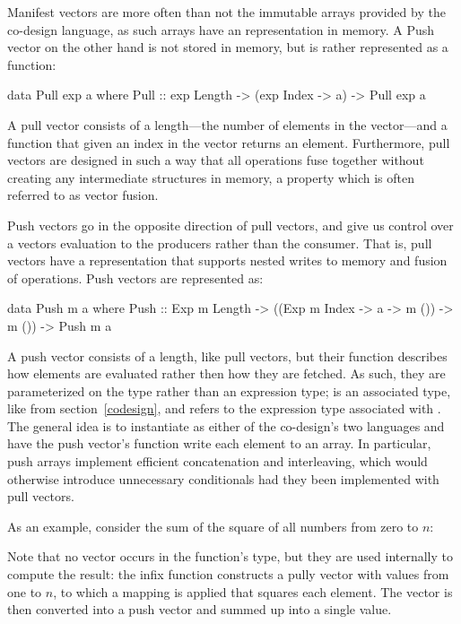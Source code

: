 \documentclass[../paper.tex]{subfiles}
\begin{document}
Manifest vectors are more often than not the immutable arrays provided by the co-design language, as such arrays have an representation in memory. A Push vector on the other hand is not stored in memory, but is rather represented as a function:

\begin{code}
data Pull exp a where
  Pull :: exp Length -> (exp Index -> a) -> Pull exp a
\end{code}

\noindent A pull vector consists of a length---the number of elements in the vector---and a function that given an index in the vector returns an element. Furthermore, pull vectors are designed in such a way that all operations fuse together without creating any intermediate structures in memory, a property which is often referred to as vector fusion.

Push vectors go in the opposite direction of pull vectors, and give us control over a vectors evaluation to the producers rather than the consumer. That is, pull vectors have a representation that supports nested writes to memory and fusion of operations. Push vectors are represented as:

\begin{code}
data Push m a where
  Push :: Exp m Length -> ((Exp m Index -> a -> m ()) -> m ()) -> Push m a
\end{code}

\noindent A push vector consists of a length, like pull vectors, but their function describes how elements are evaluated rather then how they are fetched. As such, they are parameterized on the type  rather than an expression type;  is an associated type, like  from section~\ref{codesign}, and refers to the expression type associated with . The general idea is to instantiate  as either of the co-design's two languages and have the push vector's function write each element to an array. In particular, push arrays implement efficient concatenation and interleaving, which would otherwise introduce unnecessary conditionals had they been implemented with pull vectors.

As an example, consider the sum of the square of all numbers from zero to $n$:


\noindent Note that no vector occurs in the function's type, but they are used internally to compute the result: the infix function  constructs a pully vector with values from one to $n$, to which a mapping is applied that squares each element. The vector is then converted into a push vector and summed up into a single value.
\end{document}
